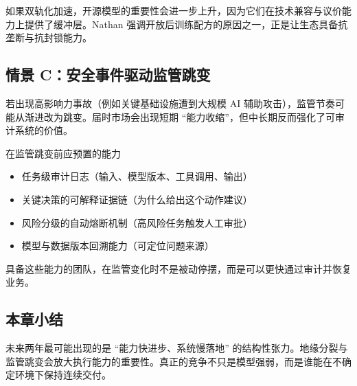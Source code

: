 如果双轨化加速，开源模型的重要性会进一步上升，因为它们在技术兼容与议价能力上提供了缓冲层。Nathan 强调开放后训练配方的原因之一，正是让生态具备抗垄断与抗封锁能力。

\subsection{情景 C：安全事件驱动监管跳变}

若出现高影响力事故（例如关键基础设施遭到大规模 AI 辅助攻击），监管节奏可能从渐进改为跳变。届时市场会出现短期 ``能力收缩''，但中长期反而强化了可审计系统的价值。

\begin{importantbox}{在监管跳变前应预置的能力}
\begin{itemize}
    \item 任务级审计日志（输入、模型版本、工具调用、输出）
    \item 关键决策的可解释证据链（为什么给出这个动作建议）
    \item 风险分级的自动熔断机制（高风险任务触发人工审批）
    \item 模型与数据版本回溯能力（可定位问题来源）
\end{itemize}

具备这些能力的团队，在监管变化时不是被动停摆，而是可以更快通过审计并恢复业务。
\end{importantbox}

\subsection{本章小结}

未来两年最可能出现的是 ``能力快进步、系统慢落地'' 的结构性张力。地缘分裂与监管跳变会放大执行能力的重要性。真正的竞争不只是模型强弱，而是谁能在不确定环境下保持连续交付。

